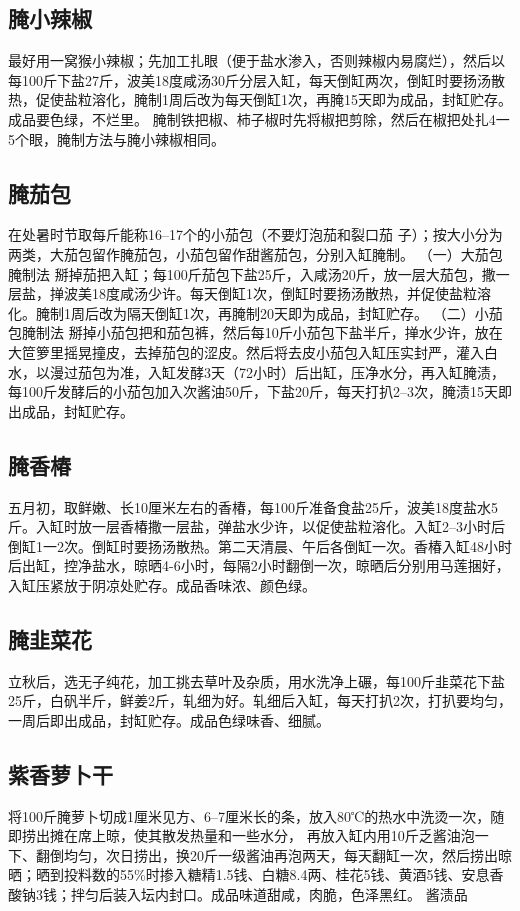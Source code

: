 \documentclass{ctexbook}
\begin{document}
\subsection{腌小辣椒}
最好用一窝猴小辣椒；先加工扎眼（便于盐水渗入，否则辣椒内易腐烂），然后以每100斤下盐27斤，波美18度咸汤30斤分层入缸，每天倒缸两次，倒缸时要扬汤散热，促使盐粒溶化，腌制1周后改为每天倒缸1次，再腌15天即为成品，封缸贮存。成品要色绿，不烂里。
腌制铁把椒、柿子椒时先将椒把剪除，然后在椒把处扎4一5个眼，腌制方法与腌小辣椒相同。
\subsection{腌茄包}
在处暑时节取每斤能称16--17个的小茄包（不要灯泡茄和裂口茄
子）；按大小分为两类，大茄包留作腌茄包，小茄包留作甜酱茄包，分别入缸腌制。
（一）大茄包腌制法
掰掉茄把入缸；每100斤茄包下盐25斤，入咸汤20斤，放一层大茄包，撒一层盐，掸波美18度咸汤少许。每天倒缸1次，倒缸时要扬汤散热，并促使盐粒溶化。腌制1周后改为隔天倒缸1次，再腌制20天即为成品，封缸贮存。
（二）小茄包腌制法
掰掉小茄包把和茄包裤，然后每10斤小茄包下盐半斤，掸水少许，放在大笸箩里摇晃撞皮，去掉茄包的涩皮。然后将去皮小茄包入缸压实封严，灌入白水，以漫过茄包为准，入缸发酵3天（72小时）后出缸，压净水分，再入缸腌渍，每100斤发酵后的小茄包加入次酱油50斤，下盐20斤，每天打扒2--3次，腌渍15天即出成品，封缸贮存。
\subsection{腌香椿}
五月初，取鲜嫩、长10厘米左右的香椿，每100斤准备食盐25斤，波美18度盐水5斤。入缸时放一层香椿撒一层盐，弹盐水少许，以促使盐粒溶化。入缸2--3小时后倒缸1一2次。倒缸时要扬汤散热。第二天清晨、午后各倒缸一次。香椿入缸48小时后出缸，控净盐水，晾晒4-6小时，每隔2小时翻倒一次，晾晒后分别用马莲捆好，入缸压紧放于阴凉处贮存。成品香味浓、颜色绿。
\subsection{腌韭菜花}
立秋后，选无子纯花，加工挑去草叶及杂质，用水洗净上碾，每100斤韭菜花下盐25斤，白矾半斤，鲜姜2斤，轧细为好。轧细后入缸，每天打扒2次，打扒要均匀，一周后即出成品，封缸贮存。成品色绿味香、细腻。
\subsection{紫香萝卜干}
将100斤腌萝卜切成1厘米见方、6--7厘米长的条，放入80℃的热水中洗烫一次，随即捞出摊在席上晾，使其散发热量和一些水分，
再放入缸内用10斤乏酱油泡一下、翻倒均匀，次日捞出，换20斤一级酱油再泡两天，每天翻缸一次，然后捞出晾晒；晒到投料数的55\%时掺入糖精1.5钱、白糖8.4两、桂花5钱、黄酒5钱、安息香酸钠3钱；拌匀后装入坛内封口。成品味道甜咸，肉脆，色泽黑红。
酱渍品
\end{document}
